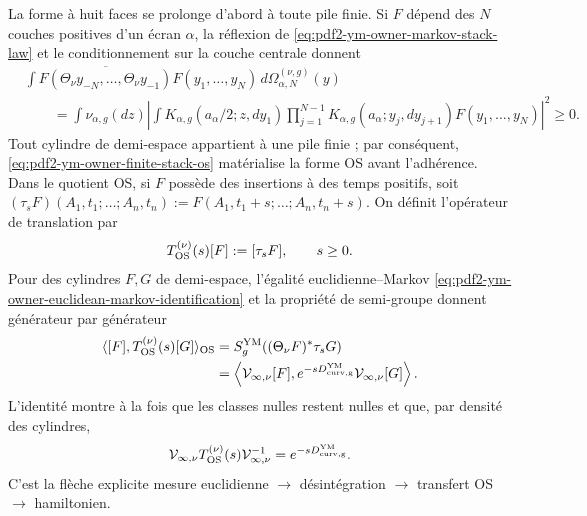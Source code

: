 La forme à huit faces se prolonge d’abord à toute pile finie. Si $F$ dépend des
$N$ couches positives d’un écran $\alpha$, la réflexion de
\eqref{eq:pdf2-ym-owner-markov-stack-law} et le conditionnement sur la couche centrale donnent
\begin{equation}\label{eq:pdf2-ym-owner-finite-stack-os}
 \begin{aligned}
 &\int \overline{F(\Theta_\nu y_{-N},\ldots,
                         \Theta_\nu y_{-1})}
          F(y_1,\ldots,y_N)\,d\Omega_{\alpha,N}^{(\nu,g)}(y)\\
 &\qquad=
 \int\nu_{\alpha,g}(dz)\left|
  \int K_{\alpha,g}(a_\alpha/2;z,dy_1)
       \prod_{j=1}^{N-1}K_{\alpha,g}(a_\alpha;y_j,dy_{j+1})
       F(y_1,\ldots,y_N)
 \right|^2\ge0.
 \end{aligned}
\end{equation}
Tout cylindre de demi-espace appartient à une pile finie ; par conséquent, \eqref{eq:pdf2-ym-owner-finite-stack-os} matérialise la forme OS avant l'adhérence. Dans le quotient OS, si $F$ possède des insertions à des temps positifs, soit $(\tau_sF)(A_1,t_1;\ldots;A_n,t_n):=
F(A_1,t_1+s;\ldots;A_n,t_n+s)$. On définit l'opérateur de translation par
\begin{equation}\label{eq:pdf2-ym-owner-os-transfer-operator}
 T_{\rm OS}^{(\nu)}(s)[F]:=[\tau_sF],
 \qquad s\ge0.
\end{equation}
Pour des cylindres $F,G$ de demi-espace, l’égalité euclidienne--Markov
\eqref{eq:pdf2-ym-owner-euclidean-markov-identification} et la propriété de
semi-groupe donnent générateur par générateur
\begin{equation}\label{eq:pdf2-ym-owner-os-markov-intertwining}
 \begin{aligned}
 \langle[F],T_{\rm OS}^{(\nu)}(s)[G]\rangle_{\rm OS}
 &=S_g^{\rm YM}((\Theta_\nu F)^*\tau_sG)\\
 &=\left\langle
    \mathcal V_{\infty,\nu}[F],
    e^{-sD_{\rm curv,g}^{\rm YM}}
    \mathcal V_{\infty,\nu}[G]
   \right\rangle .
 \end{aligned}
\end{equation}
L’identité montre à la fois que les classes nulles restent nulles et que,
par densité des cylindres,
\begin{equation}\label{eq:pdf2-ym-owner-os-generator-identification}
 \mathcal V_{\infty,\nu}T_{\rm OS}^{(\nu)}(s)
 \mathcal V_{\infty,\nu}^{-1}
 =e^{-sD_{\rm curv,g}^{\rm YM}}.
\end{equation}
C’est la flèche explicite mesure euclidienne $\to$ désintégration $\to$
transfert OS $\to$ hamiltonien.


